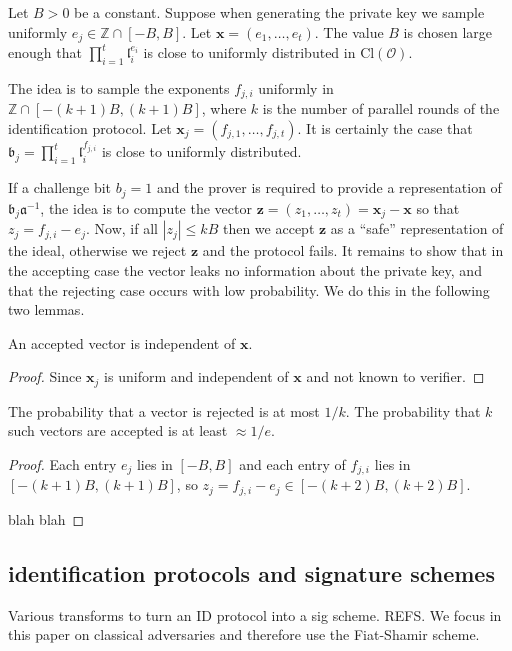 \documentclass{llncs}
\newcommand{\OO}{\mathcal{O}}
\newcommand{\Z}{\mathbb{Z}}
\newcommand{\Cl}{\text{Cl}}
\renewcommand{\a}{\mathfrak{a}}
\renewcommand{\b}{\mathfrak{b}}
\renewcommand{\l}{\mathfrak{l}}
\newcommand{\e}{\textbf{x}}
\newcommand{\f}{\textbf{x}}
\newcommand{\z}{\textbf{z}}
\begin{document}
Let $B > 0$ be a constant. Suppose when generating the private key we sample uniformly $e_j \in \Z \cap [-B, B]$. Let $\e = ( e_1, \dots, e_t )$.
The value $B$ is chosen large enough that $\prod_{i=1}^t \l_i^{e_i}$ is close to uniformly distributed in $\Cl(\OO)$.

The idea is to sample the exponents $ f_{j,i} $ uniformly in $\Z \cap [-(k+1)B, (k+1)B]$, where $k$ is the number of parallel rounds of the identification protocol.
Let $\f_j = (f_{j,1}, \dots, f_{j,t} )$.
It is certainly the case that $\b_j = \prod_{i=1}^t \l_i^{f_{j,i}}$ is close to uniformly distributed.

If a challenge bit $b_j = 1$ and the prover is required to provide a representation of $\b_j \a^{-1}$, the idea is to compute the vector $\z = (z_1, \dots, z_t) = \f_j - \e$ so that $z_j = f_{j,i} - e_j $.
Now, if all $|z_j| \le kB$ then we accept $\z$ as a ``safe'' representation of the ideal, otherwise we reject $\z$ and the protocol fails.
It remains to show that in the accepting case the vector leaks no information about the private key, and that the rejecting case occurs with low probability. We do this in the following two lemmas.

\begin{lemma}
An accepted vector is independent of $\e$.
\end{lemma}

\begin{proof}
Since $\f_j$ is uniform and independent of $\e$ and not known to verifier.
\end{proof}


\begin{lemma}
The probability that a vector is rejected is at most $1/k$.
The probability that $k$ such vectors are accepted is at least $ \approx 1/e$.
\end{lemma}

\begin{proof}
Each entry $e_j$ lies in $[-B,B]$ and each entry of $f_{j,i}$ lies in $[-(k+1)B, (k+1)B]$,
so $z_j = f_{j,i} - e_j \in [-(k+2)B, (k+2)B]$.

blah blah
\end{proof}



\subsection{identification protocols and signature schemes}

Various transforms to turn an ID protocol into a sig scheme.
REFS.
We focus in this paper on classical adversaries and therefore use the Fiat-Shamir scheme.
\end{document}
